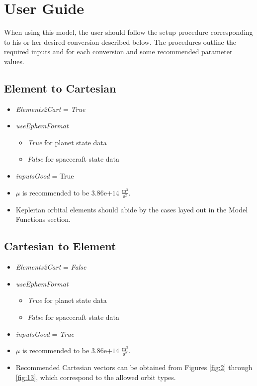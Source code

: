 \section{User Guide}
When using this model, the user should follow the setup procedure corresponding to his or her desired conversion described below. The procedures outline the required inputs and for each conversion and some recommended parameter values.
\subsection{Element to Cartesian}
	\begin{itemize}
		\item \textit{Elements2Cart} = \textit{True}
		\item \textit{useEphemFormat}
		\begin{itemize}
			\item \textit{True} for planet state data
			\item \textit{False} for spacecraft state data
		\end{itemize}
		\item \textit{inputsGood} = True
		\item $\mu$ is recommended to be $3.86\text{e+}14$ $\frac{\text{m}^3}{\text{s}^2}$.
		\item Keplerian orbital elements should abide by the cases layed out in the Model Functions section.
	\end{itemize}
\subsection{Cartesian to Element}
	\begin{itemize}
		\item \textit{Elements2Cart} = \textit{False}
		\item \textit{useEphemFormat}
		\begin{itemize}
			\item \textit{True} for planet state data
			\item \textit{False} for spacecraft state data
		\end{itemize}
		\item \textit{inputsGood} = \textit{True}
		\item $\mu$ is recommended to be $3.86\text{e+}14$ $\frac{\text{m}^3}{\text{s}^2}$.
		\item Recommended Cartesian vectors can be obtained from Figures \ref{fig:2} through \ref{fig:13}, which correspond to the allowed orbit types.
	\end{itemize}

